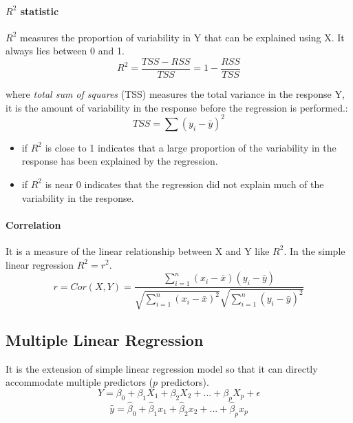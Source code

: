 \documentclass[a4paper]{article}
\begin{document}
				\paragraph{$R^2$ statistic}
					$R^2$ measures the proportion of variability in Y that can be explained using X. It always lies between 0 and 1.
				\begin{equation}
					R^2 = \frac{TSS - RSS}{TSS} = 1 - \frac{RSS}{TSS}
				\end{equation}
				
				where \textit{total sum of squares} (TSS) measures the total variance in the response Y, it is the amount of variability in the response before the regression is performed.:
				\begin{equation}
					TSS = \sum(y_i - \bar{y})^2
				\end{equation}
				
				\begin{itemize}
					\item if $R^2$ is close to 1 indicates that a large proportion of the variability in the response has been explained by the regression.
					\item if $R^2$ is near 0 indicates that the regression did not explain much of the variability in the response.
				\end{itemize}
				
				\paragraph{Correlation} It is a measure of the linear relationship between X and Y like $R^2$. In the simple linear regression $R^2 = r^2$.
				\begin{equation}
					r = Cor(X,Y) = \frac{\sum_{i=1}^n (x_i - \bar{x}) (y_i - \bar{y})}{\sqrt{ \sum_{i=1}^n (x_i - \bar{x})^2 } \sqrt{ \sum_{i=1}^n (y_i - \bar{y})^2}}
				\end{equation}
				
			\subsection{Multiple Linear Regression}
				It is the extension of simple linear regression model so that it can directly accommodate multiple predictors ($p$ predictors).
				\begin{equation}
					Y = \beta_0 + \beta_1 X_1 + \beta_2 X_2 + ... + \beta_p X_p + \epsilon
				\end{equation}
				\begin{equation}
					\hat{y} = \hat{\beta}_0 + \hat{\beta}_1 x_1 + \hat{\beta}_2 x_2 + ... + \hat{\beta}_p x_p
				\end{equation}
				
\end{document}

